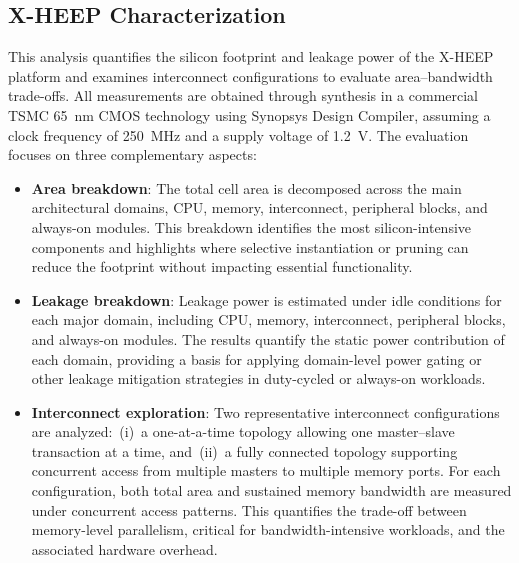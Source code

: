         \subsection{X-HEEP Characterization}

            This analysis quantifies the silicon footprint and leakage power of the \mbox{X-HEEP} platform and examines interconnect configurations to evaluate area–bandwidth trade-offs. All measurements are obtained through synthesis in a commercial \mbox{TSMC} \SI{65}{\nano\meter} CMOS technology using Synopsys Design Compiler, assuming a clock frequency of \SI{250}{\mega\hertz} and a supply voltage of \SI{1.2}{\volt}. The evaluation focuses on three complementary aspects:
            
            \vspace{-1em}
            \begin{itemize}
                \item \textbf{Area breakdown}: The total cell area is decomposed across the main architectural domains, CPU, memory, interconnect, peripheral blocks, and always-on modules. This breakdown identifies the most silicon-intensive components and highlights where selective instantiation or pruning can reduce the footprint without impacting essential functionality.
                
                \item \textbf{Leakage breakdown}: Leakage power is estimated under idle conditions for each major domain, including CPU, memory, interconnect, peripheral blocks, and always-on modules. The results quantify the static power contribution of each domain, providing a basis for applying domain-level power gating or other leakage mitigation strategies in duty-cycled or always-on workloads.
                
                \item \textbf{Interconnect exploration}: Two representative interconnect configurations are analyzed:~(i)~a one-at-a-time topology allowing one master–slave transaction at a time, and~(ii)~a fully connected topology supporting concurrent access from multiple masters to multiple memory ports. For each configuration, both total area and sustained memory bandwidth are measured under concurrent access patterns. This quantifies the trade-off between memory-level parallelism, critical for bandwidth-intensive workloads, and the associated hardware overhead.
            \end{itemize}
            \vspace{-1em}

